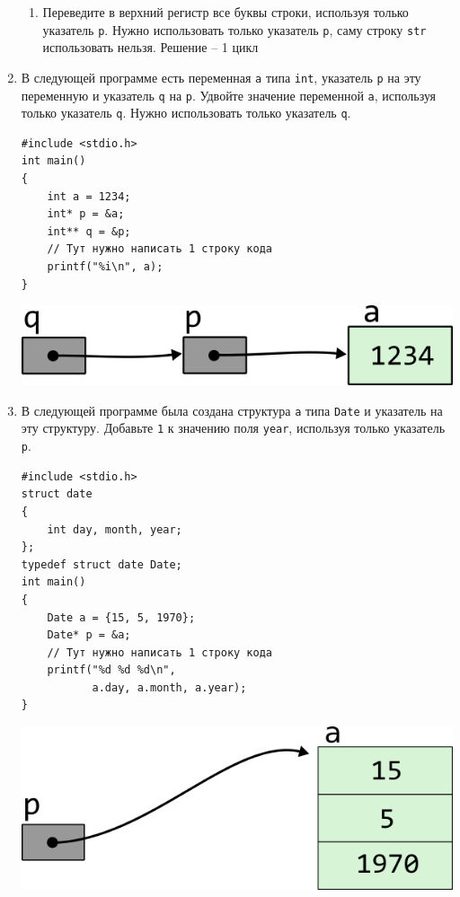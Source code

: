 \documentclass{article}
\begin{document}
\begin{enumerate}
\begin{enumerate}
\item Переведите в верхний регистр все буквы строки, используя только указатель \texttt{p}. Нужно использовать только указатель \texttt{p}, саму строку \texttt{str} использовать нельзя. Решение -- 1 цикл
\end{enumerate}


\item В следующей программе есть переменная \texttt{a} типа \texttt{int}, указатель \texttt{p} на эту переменную и указатель \texttt{q} на \texttt{p}. Удвойте значение переменной \texttt{a}, используя только указатель \texttt{q}. Нужно использовать только указатель \texttt{q}.
\begin{multicols}{2}
\begin{lstlisting}
#include <stdio.h>
int main() 
{
    int a = 1234;
    int* p = &a;
    int** q = &p;
    // Тут нужно написать 1 строку кода
    printf("%i\n", a);
}
\end{lstlisting}

\vfill \null    
\columnbreak
\vfill \null 


\begin{center}
\includegraphics[scale=1]{../images/pointer_schemes/pointer_to_pointer_to_int.png}
\end{center}
\end{multicols}
\item В следующей программе была создана структура \texttt{a} типа \texttt{Date} и указатель на эту структуру. Добавьте \texttt{1} к значению поля \texttt{year}, используя только указатель \texttt{p}.
\begin{multicols}{2}
\begin{lstlisting}
#include <stdio.h>
struct date 
{
    int day, month, year;
};
typedef struct date Date;
int main() 
{
    Date a = {15, 5, 1970};
    Date* p = &a;
    // Тут нужно написать 1 строку кода
    printf("%d %d %d\n", 
           a.day, a.month, a.year);
}
\end{lstlisting}

\vfill \null    
\columnbreak
\vfill \null 

\includegraphics[scale=1]{../images/pointer_schemes/pointer_to_struct_date.png}
\end{multicols}


\end{enumerate}
\end{document}
